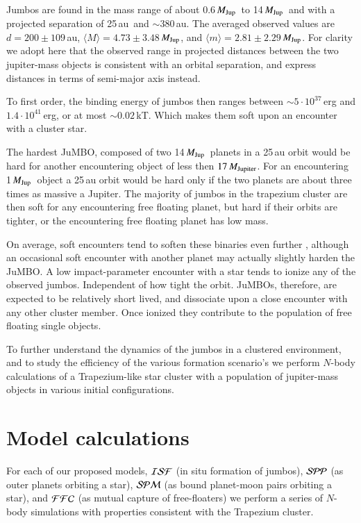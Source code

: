 \documentclass[aa]{lib/aa}
\newcommand{\MJup}{\mbox{${M}_{\rm Jup}$}}
\newcommand{\jumbo}{\mbox{JuMBO}}
\newcommand{\jumbos}{\mbox{JuMBOs}}
\begin{document}
Jumbos are found in the mass range of about 0.6\,\MJup\, to
14\,\MJup\, and with a projected separation of 25\,au\, and $\sim
380$\,au.  The averaged observed values are $d=200\pm109$\,au,
$\langle M\rangle = 4.73\pm3.48$\,\MJup, and $\langle m\rangle =
2.81\pm2.29$\,\MJup.  For clarity we adopt here that the observed
range in projected distances between the two jupiter-mass objects is
consistent with an orbital separation, and express distances in terms
of semi-major axis instead.

To first order, the binding energy of jumbos then ranges between $\sim
5\cdot 10^{37}$\,erg and $1.4\cdot 10^{41}$\,erg, or at most $\sim
0.02$\,kT. Which makes them soft upon an encounter with a cluster
star.

The hardest \jumbo, composed of two 14\,\MJup\, planets in a 25\,au
orbit would be hard for another encountering object of less then
$17\,M_{\rm Jupiter}$.  For an encountering 1\,\MJup\, object a 25\,au
orbit would be hard only if the two planets are about three times as
massive a Jupiter.  The majority of jumbos in the trapezium cluster
are then soft for any encountering free floating planet, but
hard if their orbits are tighter, or the encountering free floating
planet has low mass.

On average, soft encounters tend to soften these binaries even further
\citep{1975MNRAS.173..729H}, although an occasional soft encounter
with another planet may actually slightly harden the \jumbo.  A low
impact-parameter encounter with a star tends to ionize any of the
observed jumbos.  Independent of how tight the orbit.  \jumbos,
therefore, are expected to be relatively short lived, and dissociate
upon a close encounter with any other cluster member.  Once ionized
they contribute to the population of free floating single objects.

To further understand the dynamics of the jumbos in a clustered
environment, and to study the efficiency of the various formation
scenario's we perform $N$-body calculations of a Trapezium-like star
cluster with a population of jupiter-mass objects in various initial
configurations.

\section{Model calculations}

For each of our proposed models, ${\cal ISF}$ (in situ formation of
jumbos), ${\cal SPP}$ (as outer planets orbiting a star), ${\cal SPM}$
(as bound planet-moon pairs orbiting a star), and ${\cal FFC}$ (as
mutual capture of free-floaters) we perform a series of $N$-body
simulations with properties consistent with the Trapezium cluster.
\end{document}
